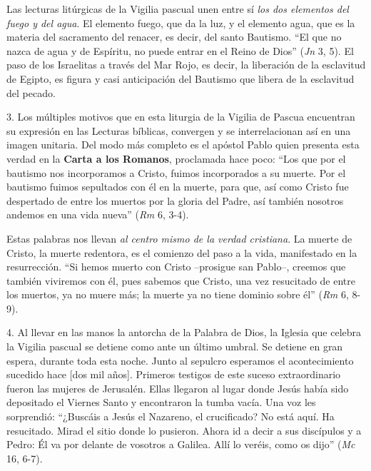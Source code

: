 			\begin{body}Las lecturas litúrgicas de la Vigilia pascual unen entre sí \textit{los dos elementos del fuego y del agua}. El elemento fuego, que da la luz, y el elemento agua, que es la materia del sacramento del renacer, es decir, del santo Bautismo. “El que no nazca de agua y de Espíritu, no puede entrar en el Reino de Dios” (\textit{Jn} 3, 5). El paso de los Israelitas a través del Mar Rojo, es decir, la liberación de la esclavitud de Egipto, es figura y casi anticipación del Bautismo que libera de la esclavitud del pecado.\end{body}
			
			\begin{body}3. Los múltiples motivos que en esta liturgia de la Vigilia de Pascua encuentran su expresión en las Lecturas bíblicas, convergen y se interrelacionan así en una imagen unitaria. Del modo más completo es el apóstol Pablo quien presenta esta verdad en la \textbf{Carta a los Romanos}, proclamada hace poco: “Los que por el bautismo nos incorporamos a Cristo, fuimos incorporados a su muerte. Por el bautismo fuimos sepultados con él en la muerte, para que, así como Cristo fue despertado de entre los muertos por la gloria del Padre, así también nosotros andemos en una vida nueva” (\textit{Rm} 6, 3-4).\end{body}
			
			\begin{body}Estas palabras nos llevan \textit{al centro mismo de la verdad cristiana}. La muerte de Cristo, la muerte redentora, es el comienzo del paso a la vida, manifestado en la resurrección. “Si hemos muerto con Cristo –prosigue san Pablo–, creemos que también viviremos con él, pues sabemos que Cristo, una vez resucitado de entre los muertos, ya no muere más; la muerte ya no tiene dominio sobre él” (\textit{Rm} 6, 8-9).\end{body}
			
			\begin{body}4. Al llevar en las manos la antorcha de la Palabra de Dios, la Iglesia que celebra la Vigilia pascual se detiene como ante un último umbral. Se detiene en gran espera, durante toda esta noche. Junto al sepulcro esperamos el acontecimiento sucedido hace [dos mil años]. Primeros testigos de este suceso extraordinario fueron las mujeres de Jerusalén. Ellas llegaron al lugar donde Jesús había sido depositado el Viernes Santo y encontraron la tumba vacía. Una voz les sorprendió: “¿Buscáis a Jesús el Nazareno, el crucificado? No está aquí. Ha resucitado. Mirad el sitio donde lo pusieron. Ahora id a decir a sus discípulos y a Pedro: Él va por delante de vosotros a Galilea. Allí lo veréis, como os dijo” (\textit{Mc} 16, 6-7).\end{body}
			
